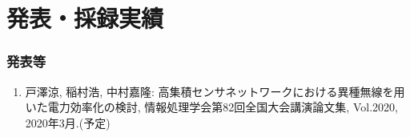 \chapter*{発表・採録実績}


\subsection*{発表等}
\begin{enumerate}
\renewcommand{\labelenumi}{[\arabic{enumi}]}
    \item 戸澤涼, 稲村浩, 中村嘉隆: 高集積センサネットワークにおける異種無線を用いた電力効率化の検討, 情報処理学会第82回全国大会講演論文集, Vol.2020, 2020年3月.(予定)
\end{enumerate}